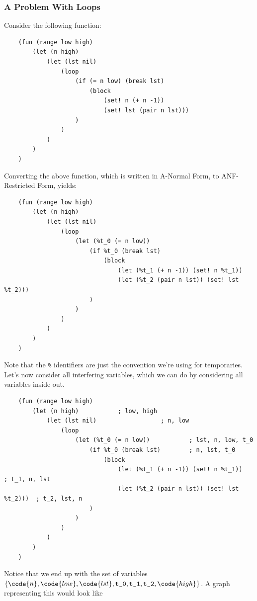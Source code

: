\subsubsection{A Problem With Loops}
Consider the following function:
\begin{verbatim}
    (fun (range low high)
        (let (n high)
            (let (lst nil)
                (loop
                    (if (= n low) (break lst)
                        (block
                            (set! n (+ n -1))
                            (set! lst (pair n lst)))
                    )
                )
            )
        )
    )
\end{verbatim}
Converting the above function, which is written in A-Normal Form, to ANF-Restricted Form, yields:
\begin{verbatim}
    (fun (range low high)
        (let (n high)
            (let (lst nil)
                (loop
                    (let (%t_0 (= n low))
                        (if %t_0 (break lst)
                            (block
                                (let (%t_1 (+ n -1)) (set! n %t_1))
                                (let (%t_2 (pair n lst)) (set! lst %t_2)))
                        )
                    )
                )
            )
        )
    )\end{verbatim}
Note that the \verb|%| identifiers are just the convention we're using for temporaries. Let's now consider all interfering variables, which we can do by considering all variables inside-out. 
\begin{verbatim}
    (fun (range low high)
        (let (n high)           ; low, high
            (let (lst nil)                  ; n, low
                (loop
                    (let (%t_0 (= n low))           ; lst, n, low, t_0
                        (if %t_0 (break lst)        ; n, lst, t_0
                            (block
                                (let (%t_1 (+ n -1)) (set! n %t_1))         ; t_1, n, lst
                                (let (%t_2 (pair n lst)) (set! lst %t_2)))  ; t_2, lst, n
                        )
                    )
                )
            )
        )
    )\end{verbatim}
Notice that we end up with the set of variables $\{\code{n}, \code{low}, \code{lst}, \verb|t_0|, \verb|t_1|, \verb|t_2|, \code{high}\}$. A graph representing this would look like 
